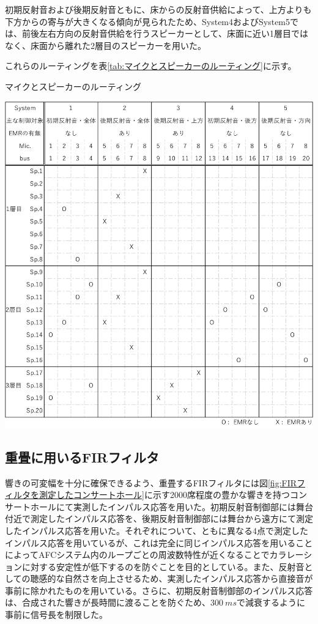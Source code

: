 \documentclass[11pt,a4j]{jreport}
\begin{document}
初期反射音および後期反射音ともに、床からの反射音供給によって、上方よりも下方からの寄与が大きくなる傾向が見られたため、System4およびSystem5では、前後左右方向の反射音供給を行うスピーカーとして、床面に近い1層目ではなく、床面から離れた2層目のスピーカーを用いた。

これらのルーティングを表\ref{tab:マイクとスピーカーのルーティング}に示す。

\newpage
{}
\begin{table}[H]
  \centering
  \caption{マイクとスピーカーのルーティング}
  \label{tab:マイクとスピーカーのルーティング}
  \includegraphics[width=1\linewidth]{images/experimentField/micSpRooting.pdf}
\end{table}

\newpage
\subsection{重畳に用いるFIRフィルタ}
響きの可変幅を十分に確保できるよう、重畳するFIRフィルタには図\ref{fig:FIRフィルタを測定したコンサートホール}に示す2000席程度の豊かな響きを持つコンサートホールにて実測したインパルス応答を用いた。初期反射音制御部には舞台付近で測定したインパルス応答を、後期反射音制御部には舞台から遠方にて測定したインパルス応答を用いた。それぞれについて、ともに異なる4点で測定したインパルス応答を用いているが、これは完全に同じインパルス応答を用いることによってAFCシステム内のループごとの周波数特性が近くなることでカラレーションに対する安定性が低下するのを防ぐことを目的としている。また、反射音としての聴感的な自然さを向上させるため、実測したインパルス応答から直接音が事前に除かれたものを用いている。さらに、初期反射音制御部のインパルス応答は、合成された響きが長時間に渡ることを防ぐため、$\SI{300}{ms}$で減衰するように事前に信号長を制限した。
\end{document}
